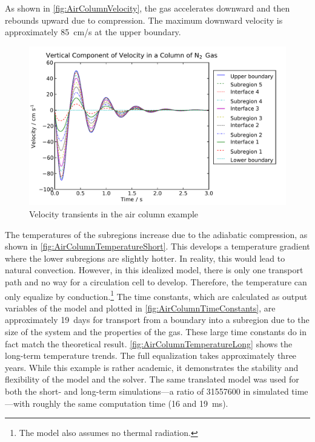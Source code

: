 As shown in \autoref{fig:AirColumnVelocity}, the gas accelerates downward and then rebounds upward due to compression.  The maximum downward velocity is approximately \SI{85}{cm/s} at the upper boundary.

\begin{figure}[htbp]
  \includegraphics[width=\linewidth]{Results/Basic/AirColumn/2/Velocity}%
  \caption{Velocity transients in the air column example}
  \label{fig:AirColumnVelocity}
\end{figure}

The temperatures of the subregions increase due to the adiabatic compression, as shown in \autoref{fig:AirColumnTemperatureShort}.  This develops a temperature gradient where the lower subregions are slightly hotter.  In reality, this would lead to natural convection.  However, in this idealized model, there is only one transport path and no way for a circulation cell to develop.  Therefore, the temperature can only equalize by conduction.\footnote{The model also assumes no thermal radiation.}  The time constants, which are calculated as output variables of the model and plotted in \autoref{fig:AirColumnTimeConstants}, are approximately 19~days for transport from a boundary into a subregion due to the size of the system and the properties of the gas.  These large time constants do in fact match the theoretical result. \autoref{fig:AirColumnTemperatureLong} shows the long-term temperature trends.  The full equalization takes approximately three years.  While this example is rather academic, it demonstrates the stability and flexibility of the model and the solver.  The same translated model was used for both the short- and long-term simulations---a ratio of \num{31557600} in simulated time---with roughly the same computation time (16 and \SI{19}{ms}).

